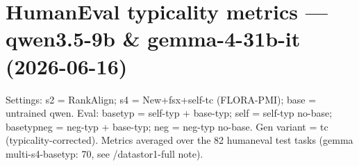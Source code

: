 \documentclass[10pt]{article}
\begin{document}
\section*{HumanEval typicality metrics --- qwen3.5-9b \& gemma-4-31b-it (2026-06-16)}
Settings: s2 = RankAlign; s4 = New+fsx+self-tc (FLORA-PMI); base = untrained qwen.
Eval: basetyp = self-typ + base-typ; self = self-typ no-base; basetypneg = neg-typ + base-typ; neg = neg-typ no-base.
Gen variant = tc (typicality-corrected). Metrics averaged over the 82 humaneval test tasks (gemma multi-s4-basetyp: 70, see /datastor1-full note).
\vspace{1em}

\end{document}

